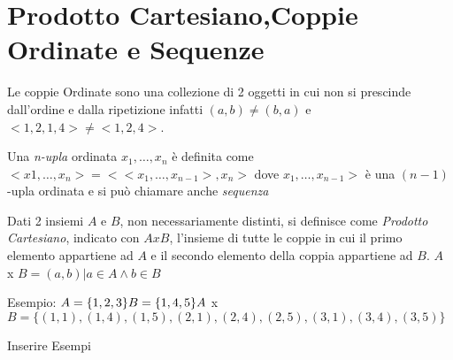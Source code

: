 \section{Prodotto Cartesiano,Coppie Ordinate e Sequenze}
Le coppie Ordinate sono una collezione di 2 oggetti in cui non si prescinde
dall'ordine e dalla ripetizione infatti $(a,b) \neq (b,a)$ e $<1,2,1,4> \neq <1,2,4>$.

Una \emph{n-upla} ordinata $x_1,\dots,x_n$ è definita come $<x1,\dots,x_n> = < <x_1,\dots,x_{n-1}>,x_n>$
dove $x_1,\dots,x_{n-1}>$ è una $(n-1)$-upla ordinata e si può chiamare anche \emph{sequenza}

Dati 2 insiemi $A$ e $B$, non necessariamente  distinti, si definisce come \textit{Prodotto Cartesiano},
indicato con $A x B$, l'insieme di tutte le coppie in cui il primo elemento appartiene ad $A$
e il secondo elemento della coppia appartiene ad $B$.\newline
$A$ x $B = {(a,b) | a \in A \land b \in B} $

Esempio:\newline
$A = \{1,2,3\} \newline
B = \{1,4,5\} \newline
A$ x $B = \{(1,1),(1,4),(1,5),(2,1),(2,4),(2,5),(3,1),(3,4),(3,5)\} $


Inserire Esempi
